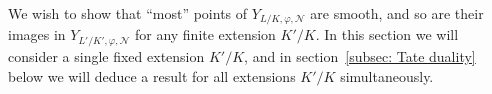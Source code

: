 \documentclass{amsart}
\DeclareMathOperator{\Lie}{Lie}
\def\ad{\mathrm{ad}}
\theoremstyle{definition}
\theoremstyle{remark}
\newcommand{\mar}[1]{}
\newcommand{\mar}[1]{\marginpar{\raggedright\tiny squirrel #1}}
\DeclareMathOperator{\rk}{rk}
\begin{document}



We wish to show that ``most'' points of $Y_{L/K,\varphi,\mathcal N}$ are
smooth, and so are their images in $Y_{L'/K',\varphi,\mathcal N}$ for any
finite extension $K'/K$. In this section we will consider a single
fixed extension $K'/K$, and in section~\ref{subsec: Tate duality}
below we will deduce a result for all extensions $K'/K$ simultaneously.
\end{document}
